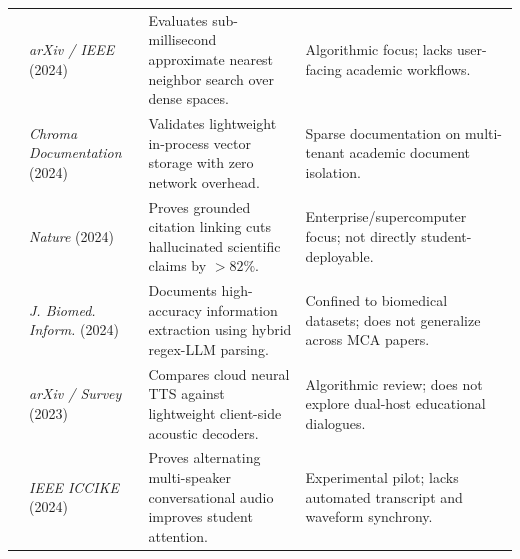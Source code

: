 \documentclass[conference]{IEEEtran}
\begin{document}
\begin{table}[t]
\begin{tabular}{@{}lp{3.5cm}p{5.5cm}p{5.5cm}@{}}
\cite{douze2024} & \textit{arXiv / IEEE} (2024) & Evaluates sub-millisecond approximate nearest neighbor search over dense spaces. & Algorithmic focus; lacks user-facing academic workflows. \\
\cite{chroma2024} & \textit{Chroma Documentation} (2024) & Validates lightweight in-process vector storage with zero network overhead. & Sparse documentation on multi-tenant academic document isolation. \\
\cite{wang2024} & \textit{Nature} (2024) & Proves grounded citation linking cuts hallucinated scientific claims by $>82\%$. & Enterprise/supercomputer focus; not directly student-deployable. \\
\cite{krithara2024} & \textit{J. Biomed. Inform.} (2024) & Documents high-accuracy information extraction using hybrid regex-LLM parsing. & Confined to biomedical datasets; does not generalize across MCA papers. \\
\cite{tan2023} & \textit{arXiv / Survey} (2023) & Compares cloud neural TTS against lightweight client-side acoustic decoders. & Algorithmic review; does not explore dual-host educational dialogues. \\
\cite{kaur2024} & \textit{IEEE ICCIKE} (2024) & Proves alternating multi-speaker conversational audio improves student attention. & Experimental pilot; lacks automated transcript and waveform synchrony. \\ \bottomrule
\end{tabular}
\end{table}
\end{document}
